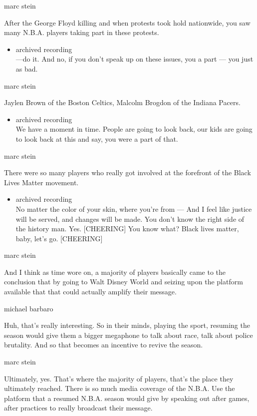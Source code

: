 marc stein

After the George Floyd killing and when protests took hold nationwide,
you saw many N.B.A. players taking part in these protests.

\begin{itemize}
\tightlist
\item
  archived recording\\
  ---do it. And no, if you don't speak up on these issues, you a part
  --- you just as bad.
\end{itemize}

marc stein

Jaylen Brown of the Boston Celtics, Malcolm Brogdon of the Indiana
Pacers.

\begin{itemize}
\tightlist
\item
  archived recording\\
  We have a moment in time. People are going to look back, our kids are
  going to look back at this and say, you were a part of that.
\end{itemize}

marc stein

There were so many players who really got involved at the forefront of
the Black Lives Matter movement.

\begin{itemize}
\tightlist
\item
  archived recording\\
  No matter the color of your skin, where you're from --- And I feel
  like justice will be served, and changes will be made. You don't know
  the right side of the history man. Yes. {[}CHEERING{]} You know what?
  Black lives matter, baby, let's go. {[}CHEERING{]}
\end{itemize}

marc stein

And I think as time wore on, a majority of players basically came to the
conclusion that by going to Walt Disney World and seizing upon the
platform available that that could actually amplify their message.

michael barbaro

Huh, that's really interesting. So in their minds, playing the sport,
resuming the season would give them a bigger megaphone to talk about
race, talk about police brutality. And so that becomes an incentive to
revive the season.

marc stein

Ultimately, yes. That's where the majority of players, that's the place
they ultimately reached. There is so much media coverage of the N.B.A.
Use the platform that a resumed N.B.A. season would give by speaking out
after games, after practices to really broadcast their message.

